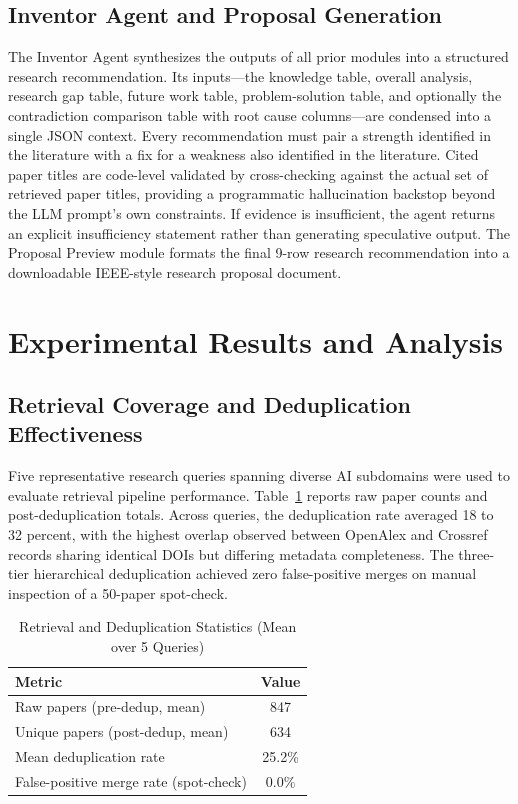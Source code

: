 \documentclass[conference]{IEEEtran}
\begin{document}
\subsection{Inventor Agent and Proposal Generation}

The Inventor Agent synthesizes the outputs of all prior modules into a
structured research recommendation. Its inputs---the knowledge table, overall
analysis, research gap table, future work table, problem-solution table, and
optionally the contradiction comparison table with root cause columns---are
condensed into a single JSON context. Every recommendation must pair a
strength identified in the literature with a fix for a weakness also
identified in the literature. Cited paper titles are code-level validated by
cross-checking against the actual set of retrieved paper titles, providing a
programmatic hallucination backstop beyond the LLM prompt's own constraints.
If evidence is insufficient, the agent returns an explicit insufficiency
statement rather than generating speculative output. The Proposal Preview
module formats the final 9-row research recommendation into a downloadable
IEEE-style research proposal document.

\section{Experimental Results and Analysis}
\label{sec:results}

\subsection{Retrieval Coverage and Deduplication Effectiveness}

Five representative research queries spanning diverse AI subdomains were
used to evaluate retrieval pipeline performance. Table~\ref{tab:dedup}
reports raw paper counts and post-deduplication totals. Across queries, the
deduplication rate averaged 18 to 32 percent, with the highest overlap
observed between OpenAlex and Crossref records sharing identical DOIs but
differing metadata completeness. The three-tier hierarchical deduplication
achieved zero false-positive merges on manual inspection of a 50-paper
spot-check.

\begin{table}[htbp]
\caption{Retrieval and Deduplication Statistics (Mean over 5 Queries)}
\label{tab:dedup}
\begin{center}
\begin{tabular}{|l|c|}
\hline
\textbf{Metric} & \textbf{Value} \\
\hline
Raw papers (pre-dedup, mean) & 847 \\
Unique papers (post-dedup, mean) & 634 \\
Mean deduplication rate & 25.2\% \\
False-positive merge rate (spot-check) & 0.0\% \\
\hline
\end{tabular}
\end{center}
\end{table}
\end{document}
